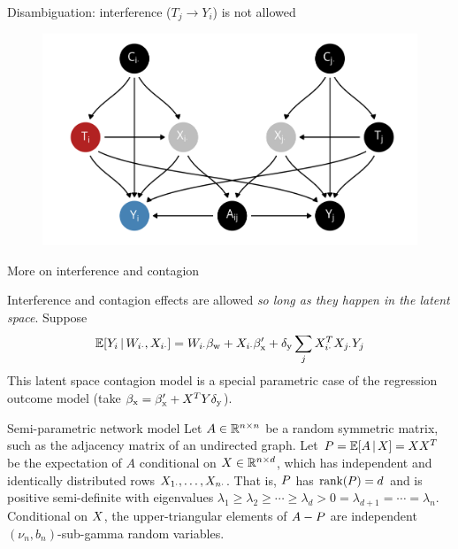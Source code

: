 \documentclass[aspectratio=169]{beamer}
\theoremstyle{remark}
\begin{document}
\begin{frame}{Disambiguation: interference ($T_j \to Y_i$) is not allowed}

    \centering

    \begin{figure}
        \includegraphics[scale=0.7]{figures/dags/homophily-mediating-interference-peer.png}
        \label{fig:interference}
    \end{figure}

\end{frame}

\begin{frame}{More on interference and contagion}

    Interference and contagion effects are allowed \emph{so long as they happen in the latent space}. Suppose
    \begin{align*}
        \E[\W_{i \cdot}, \X_{i \cdot}]{Y_i}
        = \W_{i \cdot} \betaw + \X_{i \cdot} \beta'_\text{x} + \delta_\text{y} \sum_{j} \X_{i \cdot}^T \X_{j \cdot} Y_j
    \end{align*}
    This latent space contagion model is a special parametric case of the regression outcome model (take $\beta_\text{x} = \beta'_\text{x} + X^T Y \delta_\text{y}$).

\end{frame}

\begin{frame}{Semi-parametric network model}
    Let $A \in \mathbb{R}^{n \times n}$ be a random symmetric matrix, such as the adjacency matrix of an undirected graph. Let $\Apop = \E[\X]{A} = \X \X^T$ be the expectation of $A$ conditional on $X \in \mathbb{R}^{n \times d}$, which has independent and identically distributed rows $X_{1 \cdot}, \dots, X_{n \cdot}$. That is, $P$ has $\rank \paren*{\Apop} = d$ and is positive semi-definite with eigenvalues $\lambda_1 \ge \lambda_2 \ge \cdots \ge \lambda_d > 0 = \lambda_{d+1} = \cdots = \lambda_n$. Conditional on $X$, the upper-triangular elements of $A - P$ are independent $(\nu_n, b_n)$-sub-gamma random variables.
\end{frame}
\end{document}
